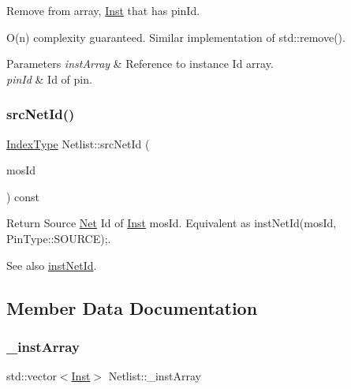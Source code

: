 Remove from array, \hyperlink{classInst}{Inst} that has pin\+Id. 

O(n) complexity guaranteed. Similar implementation of std\+::remove().


\begin{DoxyParams}{Parameters}
{\em inst\+Array} & Reference to instance Id array. \\
\hline
{\em pin\+Id} & Id of pin. \\
\hline
\end{DoxyParams}
\mbox{\label{classNetlist_a306b7d5127774b04081c9bf3b26aebd3}} 
\subsubsection{\texorpdfstring{src\+Net\+Id()}{srcNetId()}}
{\footnotesize\ttfamily \hyperlink{type_8h_a581e8093e28e7362f2b6937296190676}{Index\+Type} Netlist\+::src\+Net\+Id (\begin{DoxyParamCaption}\item[{\hyperlink{type_8h_a581e8093e28e7362f2b6937296190676}{Index\+Type}}]{mos\+Id }\end{DoxyParamCaption}) const\hspace{0.3cm}{\ttfamily [inline]}}



Return Source \hyperlink{classNet}{Net} Id of \hyperlink{classInst}{Inst} mos\+Id. Equivalent as inst\+Net\+Id(mos\+Id, Pin\+Type\+::\+S\+O\+U\+R\+C\+E);. 

\begin{DoxySeeAlso}{See also}
\hyperlink{classNetlist_af7ac6daa5f0f66a60c71b69a1d8fd670}{inst\+Net\+Id}. 
\end{DoxySeeAlso}


\subsection{Member Data Documentation}
\mbox{\label{classNetlist_a301a0c44a335af1bc3af743f645eae9e}} 
\subsubsection{\texorpdfstring{\+\_\+inst\+Array}{\_instArray}}
{\footnotesize\ttfamily std\+::vector$<$\hyperlink{classInst}{Inst}$>$ Netlist\+::\+\_\+inst\+Array\hspace{0.3cm}{\ttfamily [private]}}

